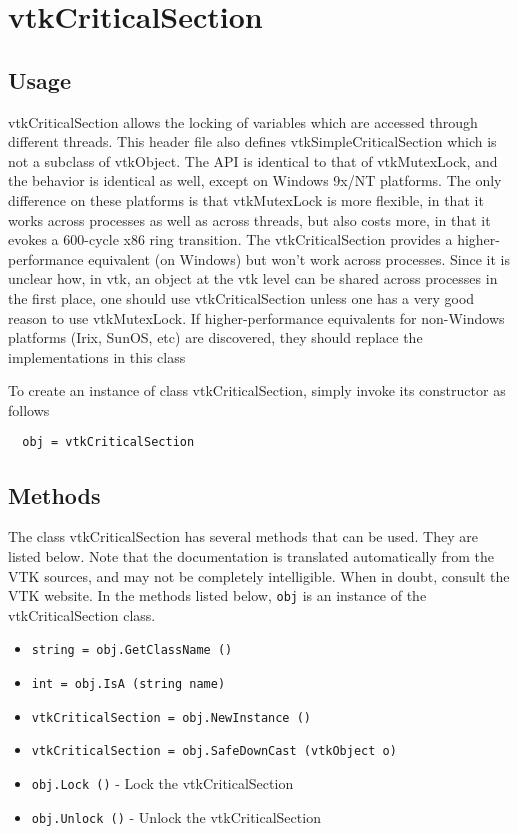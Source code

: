 \section{vtkCriticalSection}

\subsection{Usage}

 vtkCriticalSection allows the locking of variables which are accessed 
 through different threads.  This header file also defines 
 vtkSimpleCriticalSection which is not a subclass of vtkObject.
 The API is identical to that of vtkMutexLock, and the behavior is
 identical as well, except on Windows 9x/NT platforms. The only difference
 on these platforms is that vtkMutexLock is more flexible, in that
 it works across processes as well as across threads, but also costs
 more, in that it evokes a 600-cycle x86 ring transition. The 
 vtkCriticalSection provides a higher-performance equivalent (on 
 Windows) but won't work across processes. Since it is unclear how,
 in vtk, an object at the vtk level can be shared across processes
 in the first place, one should use vtkCriticalSection unless one has
 a very good reason to use vtkMutexLock. If higher-performance equivalents
 for non-Windows platforms (Irix, SunOS, etc) are discovered, they
 should replace the implementations in this class

To create an instance of class vtkCriticalSection, simply
invoke its constructor as follows
\begin{verbatim}
  obj = vtkCriticalSection
\end{verbatim}
\subsection{Methods}

The class vtkCriticalSection has several methods that can be used.
  They are listed below.
Note that the documentation is translated automatically from the VTK sources,
and may not be completely intelligible.  When in doubt, consult the VTK website.
In the methods listed below, \verb|obj| is an instance of the vtkCriticalSection class.
\begin{itemize}
\item  \verb|string = obj.GetClassName ()|

\item  \verb|int = obj.IsA (string name)|

\item  \verb|vtkCriticalSection = obj.NewInstance ()|

\item  \verb|vtkCriticalSection = obj.SafeDownCast (vtkObject o)|

\item  \verb|obj.Lock ()| -  Lock the vtkCriticalSection

\item  \verb|obj.Unlock ()| -  Unlock the vtkCriticalSection

\end{itemize}
